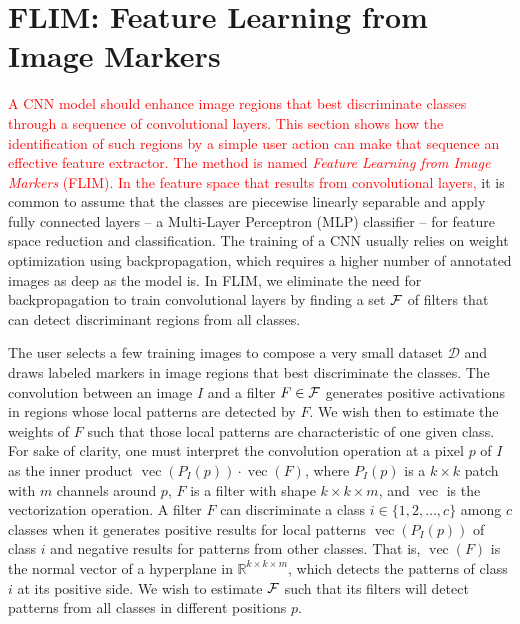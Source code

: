 \documentclass[journal, twoside]{IEEEtran}
\DeclareMathOperator{\vect}{vec}
\newcommand{\R}{\mathbb{R}}
\newcommand{\D}{\mathcal{D}}
\begin{document}
\section{FLIM: Feature Learning from Image Markers}
\label{sec:method}
  
\textcolor{red}{A CNN model should enhance image regions that best discriminate classes through a sequence of convolutional layers. This section shows how the identification of such regions by a simple user action can make that sequence an effective feature extractor. The method is named \emph{Feature Learning from Image Markers} (FLIM). In the feature space that results from convolutional layers,} it is common to assume that the classes are piecewise linearly separable and apply fully connected layers -- a Multi-Layer Perceptron (MLP) classifier -- for feature space reduction and classification. The training of a CNN usually relies on weight optimization using backpropagation, which requires a higher number of annotated images as deep as the model is. In FLIM, we eliminate the need for backpropagation to train convolutional layers by finding a set ${\cal F}$ of filters that can detect discriminant regions from all classes.

The user selects a few training images to compose a very small dataset $\D$ and draws labeled markers in image regions that best discriminate the classes. The convolution between an image $I$ and a filter $F\in {\cal F}$ generates positive activations in regions whose local patterns are detected by $F$. We wish then to estimate the weights of $F$ such that those local patterns are characteristic of one given class. For sake of clarity, one must interpret the convolution operation at a pixel $p$ of $I$ as the inner product $\vect(P_I(p)) \cdot \vect(F)$, where $P_I(p)$ is a $k\times k$ patch with $m$ channels around $p$, $F$ is a filter with shape $k\times k \times m$, and $\vect$ is the vectorization operation. A filter $F$ can discriminate a class $i \in \{1,2,\ldots,c\}$ among $c$ classes when it generates positive results for local patterns $\vect(P_I(p))$ of class $i$ and negative results for patterns from other classes. That is, $\vect(F)$ is the normal vector of a hyperplane in $\R^{k\times k\times m}$, which detects the patterns of class $i$ at its positive side. We wish to estimate ${\cal F}$ such that its filters will detect patterns from all classes in different positions $p$. 
\end{document}
